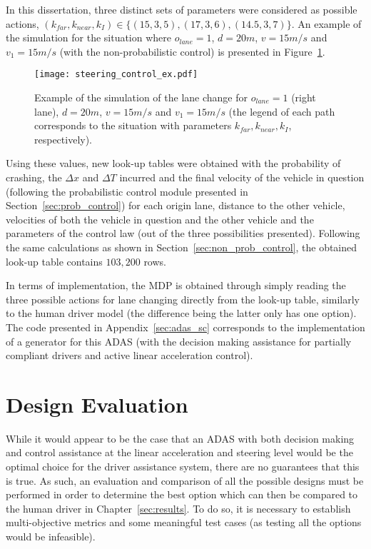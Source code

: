 In this dissertation, three distinct sets of parameters were considered as possible actions, $(k_{far}, k_{near},k_I) \in \{(15,3,5), (17,3,6), (14.5,3,7)\}$. An example of the simulation for the situation where $o_{lane} = 1$, $d = 20m$, $v = 15m/s$ and $v_1 = 15m/s$ (with the non-probabilistic control) is presented in Figure~\ref{fig:steering_control_ex}.

\begin{figure}[h]
    \centering
    \texttt{[image: steering\_control\_ex.pdf]}
    \caption{Example of the simulation of the lane change for $o_{lane} = 1$ (right lane), $d = 20m$, $v = 15m/s$ and $v_1 = 15m/s$ (the legend of each path corresponds to the situation with parameters $k_{far}, k_{near},k_I$, respectively).}
    \label{fig:steering_control_ex}
\end{figure}

Using these values, new look-up tables were obtained with the probability of crashing, the $\Delta x$ and $\Delta T$ incurred and the final velocity of the vehicle in question (following the probabilistic control module presented in Section~\ref{sec:prob_control}) for each origin lane, distance to the other vehicle, velocities of both the vehicle in question and the other vehicle and the parameters of the control law (out of the three possibilities presented). Following the same calculations as shown in Section~\ref{sec:non_prob_control}, the obtained look-up table contains $103,200$ rows.

In terms of implementation, the MDP is obtained through simply reading the three possible actions for lane changing directly from the look-up table, similarly to the human driver model (the difference being the latter only has one option). The code presented in Appendix~\ref{sec:adas_sc} corresponds to the implementation of a generator for this ADAS (with the decision making assistance for partially compliant drivers and active linear acceleration control).

\section{Design Evaluation}

While it would appear to be the case that an ADAS with both decision making and control assistance at the linear acceleration and steering level would be the optimal choice for the driver assistance system, there are no guarantees that this is true. As such, an evaluation and comparison of all the possible designs must be performed in order to determine the best option which can then be compared to the human driver in Chapter~\ref{sec:results}. To do so, it is necessary to establish multi-objective metrics and some meaningful test cases (as testing all the options would be infeasible).

